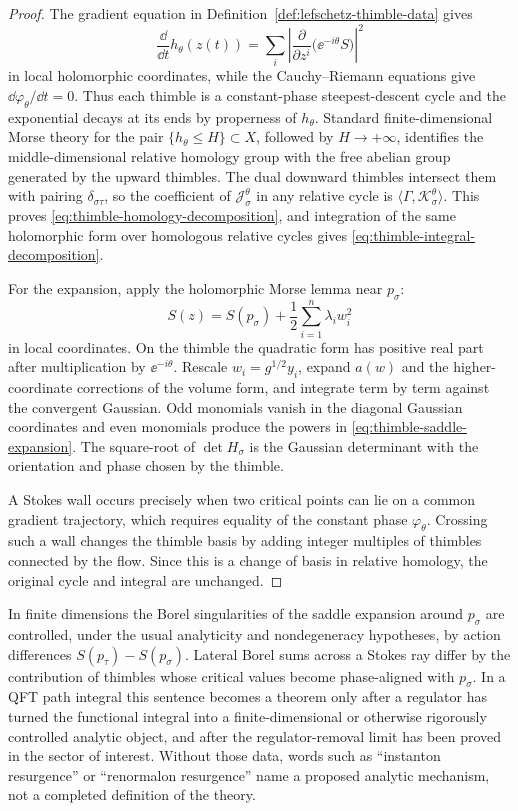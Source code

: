 \begin{proof}
The gradient equation in Definition~\ref{def:lefschetz-thimble-data} gives
\[
  \frac{\dd}{\dd t}h_\theta(z(t))
  =
  \sum_i\left|\frac{\partial}{\partial z^i}
  \bigl(\ee^{-i\theta}S\bigr)\right|^2
\]
in local holomorphic coordinates, while the Cauchy--Riemann equations give
\(\dd\varphi_\theta/\dd t=0\).  Thus each thimble is a constant-phase
steepest-descent cycle and the exponential decays at its ends by properness of
\(h_\theta\).  Standard finite-dimensional Morse theory for the pair
\(\{h_\theta\le H\}\subset X\), followed by \(H\to+\infty\), identifies the
middle-dimensional relative homology group with the free abelian group
generated by the upward thimbles.  The dual downward thimbles intersect them
with pairing \(\delta_{\sigma\tau}\), so the coefficient of
\(\mathcal J_\sigma^\theta\) in any relative cycle is
\(\langle\Gamma,\mathcal K_\sigma^\theta\rangle\).  This proves
\eqref{eq:thimble-homology-decomposition}, and integration of the same
holomorphic form over homologous relative cycles gives
\eqref{eq:thimble-integral-decomposition}.

For the expansion, apply the holomorphic Morse lemma near \(p_\sigma\):
\[
  S(z)=S(p_\sigma)+\frac12\sum_{i=1}^n \lambda_i w_i^2
\]
in local coordinates.  On the thimble the quadratic form has positive real
part after multiplication by \(\ee^{-i\theta}\).  Rescale
\(w_i=g^{1/2}y_i\), expand \(a(w)\) and the higher-coordinate corrections of
the volume form, and integrate term by term against the convergent Gaussian.
Odd monomials vanish in the diagonal Gaussian coordinates and even monomials
produce the powers in \eqref{eq:thimble-saddle-expansion}.  The square-root of
\(\det H_\sigma\) is the Gaussian determinant with the orientation and phase
chosen by the thimble.

A Stokes wall occurs precisely when two critical points can lie on a common
gradient trajectory, which requires equality of the constant phase
\(\varphi_\theta\).  Crossing such a wall changes the thimble basis by adding
integer multiples of thimbles connected by the flow.  Since this is a change
of basis in relative homology, the original cycle and integral are unchanged.
\end{proof}

\begin{remark}
\label{rem:resurgence-regulated-statement}
In finite dimensions the Borel singularities of the saddle expansion around
\(p_\sigma\) are controlled, under the usual analyticity and nondegeneracy
hypotheses, by action differences \(S(p_\tau)-S(p_\sigma)\).  Lateral Borel
sums across a Stokes ray differ by the contribution of thimbles whose critical
values become phase-aligned with \(p_\sigma\).  In a QFT path integral this
sentence becomes a theorem only after a regulator has turned the functional
integral into a finite-dimensional or otherwise rigorously controlled
analytic object, and after the regulator-removal limit has been proved in the
sector of interest.  Without those data, words such as ``instanton
resurgence'' or ``renormalon resurgence'' name a proposed analytic mechanism,
not a completed definition of the theory.
\end{remark}

